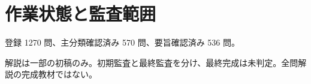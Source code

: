 \chapter{作業状態と監査範囲}
登録 1270 問、主分類確認済み 570 問、要旨確認済み 536 問。
\par 解説は一部の初稿のみ。初期監査と最終監査を分け、最終完成は未判定。全問解説の完成教材ではない。
